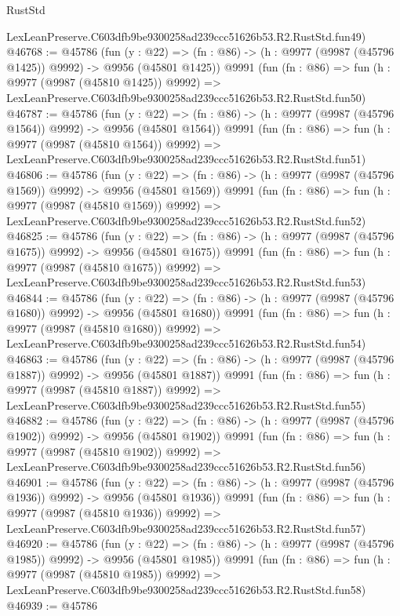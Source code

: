 \begin{lexlean}{RustStd}
\begin{coremodule}
    LexLeanPreserve.C603dfb9be9300258ad239ccc51626b53.R2.RustStd.fun49)
@46768 := @45786
    (fun (y : @22) =>
    (fn : @86) -> (h : @9977 (@9987 (@45796 @1425)) @9992) -> @9956 (@45801 @1425))
    @9991
    (fun (fn : @86) =>
    fun (h : @9977 (@9987 (@45810 @1425)) @9992) =>
    LexLeanPreserve.C603dfb9be9300258ad239ccc51626b53.R2.RustStd.fun50)
@46787 := @45786
    (fun (y : @22) =>
    (fn : @86) -> (h : @9977 (@9987 (@45796 @1564)) @9992) -> @9956 (@45801 @1564))
    @9991
    (fun (fn : @86) =>
    fun (h : @9977 (@9987 (@45810 @1564)) @9992) =>
    LexLeanPreserve.C603dfb9be9300258ad239ccc51626b53.R2.RustStd.fun51)
@46806 := @45786
    (fun (y : @22) =>
    (fn : @86) -> (h : @9977 (@9987 (@45796 @1569)) @9992) -> @9956 (@45801 @1569))
    @9991
    (fun (fn : @86) =>
    fun (h : @9977 (@9987 (@45810 @1569)) @9992) =>
    LexLeanPreserve.C603dfb9be9300258ad239ccc51626b53.R2.RustStd.fun52)
@46825 := @45786
    (fun (y : @22) =>
    (fn : @86) -> (h : @9977 (@9987 (@45796 @1675)) @9992) -> @9956 (@45801 @1675))
    @9991
    (fun (fn : @86) =>
    fun (h : @9977 (@9987 (@45810 @1675)) @9992) =>
    LexLeanPreserve.C603dfb9be9300258ad239ccc51626b53.R2.RustStd.fun53)
@46844 := @45786
    (fun (y : @22) =>
    (fn : @86) -> (h : @9977 (@9987 (@45796 @1680)) @9992) -> @9956 (@45801 @1680))
    @9991
    (fun (fn : @86) =>
    fun (h : @9977 (@9987 (@45810 @1680)) @9992) =>
    LexLeanPreserve.C603dfb9be9300258ad239ccc51626b53.R2.RustStd.fun54)
@46863 := @45786
    (fun (y : @22) =>
    (fn : @86) -> (h : @9977 (@9987 (@45796 @1887)) @9992) -> @9956 (@45801 @1887))
    @9991
    (fun (fn : @86) =>
    fun (h : @9977 (@9987 (@45810 @1887)) @9992) =>
    LexLeanPreserve.C603dfb9be9300258ad239ccc51626b53.R2.RustStd.fun55)
@46882 := @45786
    (fun (y : @22) =>
    (fn : @86) -> (h : @9977 (@9987 (@45796 @1902)) @9992) -> @9956 (@45801 @1902))
    @9991
    (fun (fn : @86) =>
    fun (h : @9977 (@9987 (@45810 @1902)) @9992) =>
    LexLeanPreserve.C603dfb9be9300258ad239ccc51626b53.R2.RustStd.fun56)
@46901 := @45786
    (fun (y : @22) =>
    (fn : @86) -> (h : @9977 (@9987 (@45796 @1936)) @9992) -> @9956 (@45801 @1936))
    @9991
    (fun (fn : @86) =>
    fun (h : @9977 (@9987 (@45810 @1936)) @9992) =>
    LexLeanPreserve.C603dfb9be9300258ad239ccc51626b53.R2.RustStd.fun57)
@46920 := @45786
    (fun (y : @22) =>
    (fn : @86) -> (h : @9977 (@9987 (@45796 @1985)) @9992) -> @9956 (@45801 @1985))
    @9991
    (fun (fn : @86) =>
    fun (h : @9977 (@9987 (@45810 @1985)) @9992) =>
    LexLeanPreserve.C603dfb9be9300258ad239ccc51626b53.R2.RustStd.fun58)
@46939 := @45786

\end{coremodule}
\end{lexlean}
